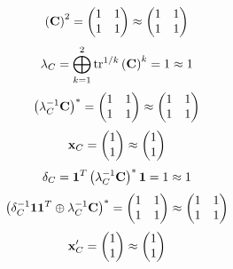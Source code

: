\documentclass[10pt,a4paper]{article}
\begin{document}
	\[
		\left(\bold{C}\right)^{2} = 
		\begin{pmatrix}
			{1}{} & {1}{} \\
			{1}{} & {1}{} \\
		\end{pmatrix}
		\approx
		\begin{pmatrix}
			1        & 1        \\
			1        & 1        \\
		\end{pmatrix}
	\]
	\[
		\lambda_{C} =  \bigoplus ^{2} _{k = 1} \operatorname{tr} ^{1 / k} \left( \bold{C} \right)^k = {1}{}\approx 1
	\]
	\[
		\left(\lambda_{C}^{-1}\bold{C}\right)^* = 
		\begin{pmatrix}
			{1}{} & {1}{} \\
			{1}{} & {1}{} \\
		\end{pmatrix}
		\approx
		\begin{pmatrix}
			1        & 1        \\
			1        & 1        \\
		\end{pmatrix}
	\]
	\[
		\bold{x}_{C} = 
		\begin{pmatrix}
			{1}{} \\
			{1}{} \\
		\end{pmatrix}
		\approx
		\begin{pmatrix}
			1        \\
			1        \\
		\end{pmatrix}
	\]
	\[
		\delta_{C} = \bold{1}^T \left(\lambda_{C}^{-1}\bold{C}\right)^* \bold{1} = {1}{}\approx 1
	\]
	\[
		\left(\delta_{C}^{-1}\bold{11}^T \oplus \lambda_{C}^{-1}\bold{C}\right)^* = 
		\begin{pmatrix}
			{1}{} & {1}{} \\
			{1}{} & {1}{} \\
		\end{pmatrix}
		\approx
		\begin{pmatrix}
			1        & 1        \\
			1        & 1        \\
		\end{pmatrix}
	\]
	\[
		\bold{x}'_{C} = 
		\begin{pmatrix}
			{1}{} \\
			{1}{} \\
		\end{pmatrix}
		\approx
		\begin{pmatrix}
			1        \\
			1        \\
		\end{pmatrix}
	\]
\end{document}
